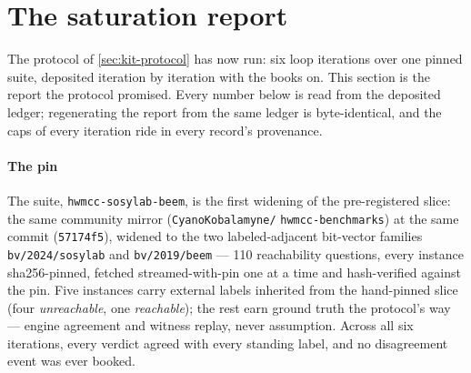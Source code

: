 
\section{The saturation report}
\label{sec:report}

The protocol of \cref{sec:kit-protocol} has now run: six loop
iterations over one pinned suite, deposited iteration by iteration
with the books on. This section is the report the protocol promised.
Every number below is read from the deposited ledger; regenerating
the report from the same ledger is byte-identical, and the caps of
every iteration ride in every record's provenance.

\paragraph{The pin}
The suite, \texttt{hwmcc-sosylab-beem}, is the first widening of the
pre-registered slice: the same community mirror
(\texttt{CyanoKobalamyne/} \texttt{hwmcc-benchmarks}) at the same
commit (\texttt{57174f5}), widened to the two labeled-adjacent
bit-vector families \texttt{bv/2024/sosylab} and
\texttt{bv/2019/beem} --- 110 reachability questions, every instance
sha256-pinned, fetched streamed-with-pin one at a time and
hash-verified against the pin. Five instances carry external labels
inherited from the hand-pinned slice (four \textit{unreachable}, one
\textit{reachable}); the rest earn ground truth the protocol's way
--- engine agreement and witness replay, never assumption. Across all
six iterations, every verdict agreed with every standing label, and
no disagreement event was ever booked.

